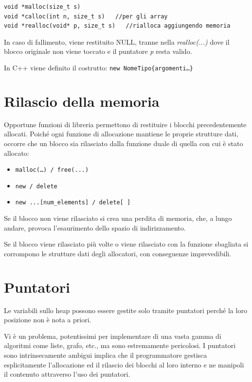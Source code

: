 \begin{verbatim}
void *malloc(size_t s)
void *calloc(int n, size_t s)   //per gli array
void *realloc(void* p, size_t s)   //rialloca aggiungendo memoria
\end{verbatim}

In caso di fallimento, viene restituito NULL, tranne nella \textit{realloc(...)} dove il blocco originale non viene toccato e il puntatore \textit{p} resta valido.\newline

In C++ viene definito il costrutto: \texttt{new NomeTipo\{argomenti…\}  }

\section{Rilascio della memoria  }

Opportune funzioni di libreria permettono di restituire i blocchi precedentemente allocati.
Poiché ogni funzione di allocazione mantiene le proprie strutture dati, occorre che un blocco sia rilasciato dalla funzione duale di quella con cui è stato allocato:

\begin{itemize}
  \item \texttt{malloc(…) / free(...)}
  \item \texttt{new / delete}
  \item \texttt{new ...[num\_elements] / delete[ ]}
\end{itemize}


Se il blocco non viene rilasciato si crea una perdita di memoria, che, a lungo andare, provoca l'esaurimento dello spazio di indirizzamento.

Se il blocco viene rilasciato più volte o viene rilasciato con la funzione sbagliata si corrompono le strutture dati degli allocatori, con conseguenze imprevedibili.

\section{Puntatori}

Le variabili sullo heap possono essere gestite solo tramite puntatori perché la loro posizione non è nota a priori.

Vi è un problema, potentissimi per implementare di una vasta gamma di algoritmi come liste, grafo, etc., ma sono estremamente pericolosi. I puntatori sono intrinsecamente ambigui implica che il programmatore gestisca esplicitamente l'allocazione ed il rilascio dei blocchi al loro interno e ne manipoli il contenuto attraverso l'uso dei puntatori.

